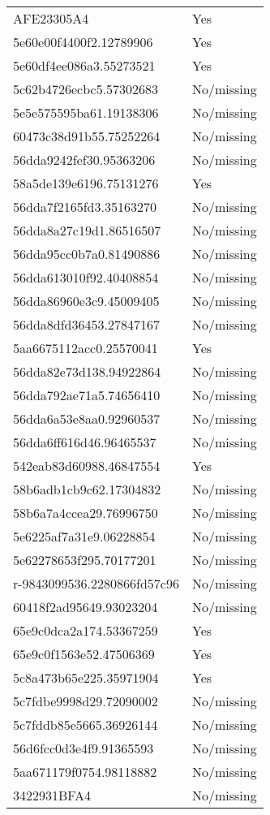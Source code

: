 \begin{tabular}{ll}
AFE23305A4 & Yes \\
5e60e00f4400f2.12789906 & Yes \\
5e60df4ee086a3.55273521 & Yes \\
5c62b4726ecbc5.57302683 & No/missing \\
5e5e575595ba61.19138306 & No/missing \\
60473c38d91b55.75252264 & No/missing \\
56dda9242fef30.95363206 & No/missing \\
58a5de139e6196.75131276 & Yes \\
56dda7f2165fd3.35163270 & No/missing \\
56dda8a27c19d1.86516507 & No/missing \\
56dda95cc0b7a0.81490886 & No/missing \\
56dda613010f92.40408854 & No/missing \\
56dda86960e3c9.45009405 & No/missing \\
56dda8dfd36453.27847167 & No/missing \\
5aa6675112acc0.25570041 & Yes \\
56dda82e73d138.94922864 & No/missing \\
56dda792ae71a5.74656410 & No/missing \\
56dda6a53e8aa0.92960537 & No/missing \\
56dda6ff616d46.96465537 & No/missing \\
542eab83d60988.46847554 & Yes \\
58b6adb1cb9c62.17304832 & No/missing \\
58b6a7a4ccea29.76996750 & No/missing \\
5e6225af7a31e9.06228854 & No/missing \\
5e62278653f295.70177201 & No/missing \\
r-9843099536.2280866fd57c96 & No/missing \\
60418f2ad95649.93023204 & No/missing \\
65e9c0dca2a174.53367259 & Yes \\
65e9c0f1563e52.47506369 & Yes \\
5c8a473b65e225.35971904 & Yes \\
5c7fdbe9998d29.72090002 & No/missing \\
5c7fddb85e5665.36926144 & No/missing \\
56d6fcc0d3e4f9.91365593 & No/missing \\
5aa671179f0754.98118882 & No/missing \\
3422931BFA4 & No/missing \\

\end{tabular}
